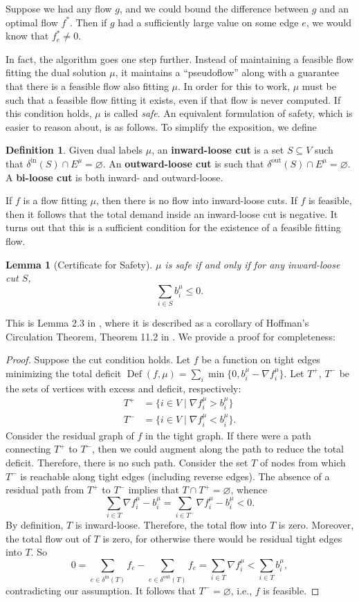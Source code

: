 \documentclass[11pt]{article}
\newtheorem{lemma}[theorem]{Lemma}
\theoremstyle{definition}
\newtheorem{definition}{Definition}[section]
\theoremstyle{definition}
\newcommand{\fu}{f^{\mu}}
\newcommand{\nfiu}{\nabla \fu_i}
\newcommand{\biu}{b_{i}^{\mu}}
\newcommand{\din}{\delta^{\text{in}}}
\newcommand{\dout}{\delta^{\text{out}}}
\DeclareMathOperator{\Def}{Def}
\begin{document}
	Suppose we had any flow $g$, and we could bound the difference between $g$ and an optimal
	flow $f^*$. Then if $g$ had a sufficiently large value on some edge $e$, we would know that
	$f^*_e \neq 0$.
	
	In fact, the algorithm goes one step further. Instead of maintaining a feasible flow
	fitting the dual solution $\mu$, it maintains a ``pseudoflow'' along with a guarantee
	that there is a feasible flow also fitting $\mu$. In order for this to work, $\mu$
	must be such that a feasible flow fitting it exists, even if that flow is never
	computed. If this condition holds, $\mu$ is called \emph{safe}. An equivalent
	formulation of safety, which is easier to reason about, is as follows. To simplify
	the exposition, we define 
	\begin{definition}
		Given dual labels $\mu$, an \textbf{inward-loose cut} is a set $S \subseteq V$ such that
		$\din(S) \cap E^\mu = \varnothing$. An \textbf{outward-loose cut}
		is such that $\dout(S) \cap E^\mu = \varnothing$. A \textbf{bi-loose cut}
		is both inward- and outward-loose.
	\end{definition}
	If $f$ is a flow fitting $\mu$, then there is no flow into inward-loose cuts.
	If $f$ is feasible, then it follows that the total demand inside an inward-loose
	cut is negative. It turns out that this is a sufficient condition for the existence
	of a feasible fitting flow.
	\begin{lemma}[Certificate for Safety] \label{lem.safety}
	$\mu$ is safe if and only if for any inward-loose cut $S$,
	\[ \sum_{i \in S} \biu \leq 0. \]
	\end{lemma}
	This is Lemma 2.3 in \cite{Olver2017}, where it is described as a corollary of Hoffman's Circulation
	Theorem, Theorem 11.2 in \cite{Schrijver2002}. We provide a proof for completeness:
	\begin{proof}
		Suppose the cut condition holds. Let $f$ be a function on tight edges minimizing
		the total deficit $\Def(f, \mu) = \sum_i \min\{0, \biu - \nfiu\}$. Let
		$T^+$, $T^-$ be the sets of vertices with excess and deficit, respectively:
		\begin{align*}
			T^+ &= \{i \in V \mid \nfiu > \biu \} \\
			T^- &= \{i \in V \mid \nfiu < \biu \}.
		\end{align*}
		Consider the residual graph of $f$ in the tight graph. If there were a path
		connecting $T^+$ to $T^-$, then we could augment along the path
		to reduce the total deficit. Therefore, there is no such path. Consider the
		set $T$ of nodes from which $T^-$ is reachable along tight edges (including reverse edges).
		The absence of a residual path from $T^+$ to $T^-$
        implies that $T \cap T^+ = \varnothing$, whence
		\[ \sum_{i \in T} \nfiu - \biu = \sum_{i \in T^-} \nfiu - \biu < 0. \]
		By definition, $T$ is inward-loose. Therefore, the total flow into $T$ is zero.
        Moreover, the total flow out of $T$ is zero, for otherwise there would be
        residual tight edges into $T$. So
		\[ 0 = \sum_{e \in \din(T)} f_e - \sum_{e \in \dout(T)} f_e
		     = \sum_{i \in T} \nfiu < \sum_{i \in T} \biu, \]
		contradicting our assumption. It follows that $T^- = \varnothing$, i.e., $f$
		is feasible.
	\end{proof}
\end{document}
